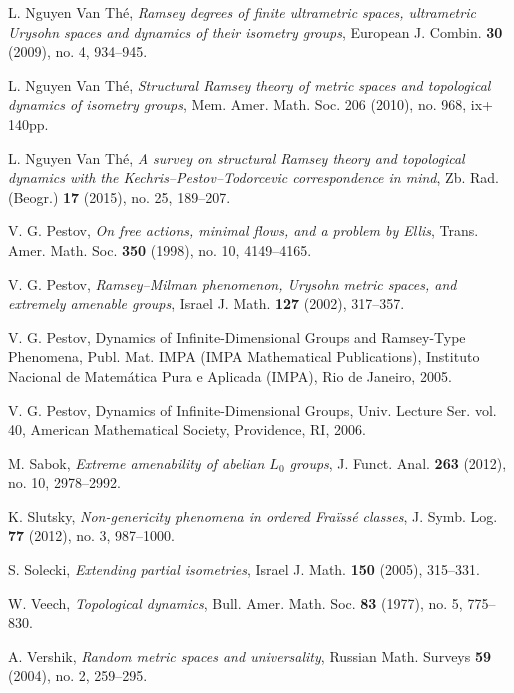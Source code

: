 \documentclass{amsart}
\theoremstyle{definition}
\theoremstyle{remark}
\begin{document}
L. Nguyen Van Th\'{e},
\textit{Ramsey degrees of finite ultrametric spaces, ultrametric Urysohn spaces and dynamics of their isometry groups},
European J. Combin. {\bf 30} (2009), no. 4, 934--945.

L. Nguyen Van Th\'e,
\textit{Structural Ramsey theory of metric spaces and topological dynamics of isometry groups},
Mem. Amer. Math. Soc. 206 (2010), no. 968, ix+ 140pp.


L. Nguyen Van Th\'{e}, 
\textit{A survey on structural Ramsey theory and topological dynamics with the Kechris--Pestov--Todorcevic correspondence in mind},
Zb. Rad. (Beogr.) {\bf 17} (2015), no. 25, 189--207.


V. G. Pestov, 
\textit{On free actions, minimal flows, and a problem by Ellis},
Trans. Amer. Math. Soc. {\bf 350} (1998), no. 10, 4149--4165.

V. G. Pestov,
\textit{Ramsey--Milman phenomenon, Urysohn metric spaces, and extremely amenable groups},
Israel J. Math. {\bf 127} (2002), 317--357.

V. G. Pestov, 
Dynamics of Infinite-Dimensional Groups and Ramsey-Type Phenomena,
Publ. Mat. IMPA (IMPA Mathematical Publications), Instituto Nacional de Matem\'{a}tica Pura e Aplicada (IMPA), Rio de Janeiro, 2005.


V. G. Pestov,
Dynamics of Infinite-Dimensional Groups, 
Univ. Lecture Ser. vol. 40, American Mathematical Society, Providence, RI, 2006.

M. Sabok,
\textit{Extreme amenability of abelian $L_0$ groups},
J. Funct. Anal. {\bf 263} (2012), no. 10, 2978--2992.

K. Slutsky,
\textit{Non-genericity phenomena in ordered Fra\"iss\'e classes},
J. Symb. Log. {\bf 77} (2012), no. 3, 987--1000.

S. Solecki,
\textit{Extending partial isometries},
Israel J. Math. {\bf 150} (2005), 315--331.

W. Veech,
\textit{Topological dynamics},
Bull. Amer. Math. Soc. {\bf 83} (1977), no. 5, 775--830.

A. Vershik,
\textit{Random metric spaces and universality},
Russian Math. Surveys {\bf 59} (2004), no. 2, 259--295.
\end{document}
